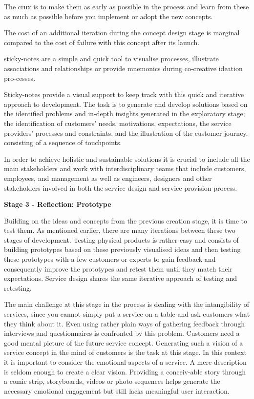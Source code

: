The crux is to make them as early as possible in the process and learn from these as much as possible before you implement or adopt the new concepts.

The cost of an additional iteration during the concept design stage is marginal compared to the cost of failure with this concept after its launch.

sticky-notes are a simple and quick tool to visualise processes, illustrate associations and relationships or provide mnemonics during co-creative ideation pro-cesses.

Sticky-notes provide a visual support to keep track with this quick and iterative approach to development. The task is to generate and develop solutions based on the identified problems and in-depth insights generated in the exploratory stage; the identification of customers’ needs, motivations, expectations, the service providers’ processes and constraints, and the illustration of the customer journey, consisting of a sequence of touchpoints.

In order to achieve holistic and sustainable solutions it is crucial to include all the main stakeholders and work with interdisciplinary teams that include customers, employees, and management as well as engineers, designers and other stakeholders involved in both the service design and service provision process.

\textbf{Stage 3 - Reflection: Prototype}

Building on the ideas and concepts from the previous creation stage, it is time to test them. As mentioned earlier, there are many iterations between these two stages of development. Testing physical products is rather easy and consists of building prototypes based on these previously visualised ideas and then testing these prototypes with a few customers or experts to gain feedback and consequently improve the prototypes and retest them until they match their expectations. Service design shares the same iterative approach of testing and retesting.

The main challenge at this stage in the process is dealing with the intangibility of services, since you cannot simply put a service on a table and ask customers what they think about it. Even using rather plain ways of gathering feedback through interviews and questionnaires is confronted by this problem. Customers need a good mental picture of the future service concept. Generating such a vision of a service concept in the mind of customers is the task at this stage. In this context it is important to consider the emotional aspects of a service. A mere description is seldom enough to create a clear vision. Providing a conceiv-able story through a comic strip, storyboards, videos or photo sequences helps generate the necessary emotional engagement but still lacks meaningful user interaction.

